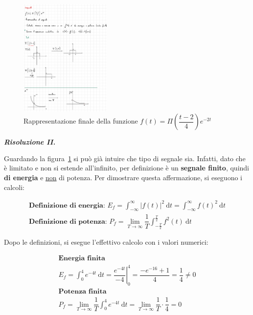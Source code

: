 \documentclass[a4paper]{article}
\begin{document}
	\begin{figure}[!htp]
		\centering
		\includegraphics[width=0.4\textwidth]{img/ex_exam/Sol_func_1.pdf}
		\caption{Rappresentazione finale della funzione $f(t) = \Pi \left(\dfrac{t-2}{4}\right) e^{-2t}$}\label{ex1_grafico}
	\end{figure}

	\newpage

	\noindent
	\textcolor{Green4}{\textbf{\emph{Risoluzione II.}}}

	Guardando la figura~\ref{ex1_grafico} si può già intuire che tipo di segnale sia. Infatti, dato che è limitato e non si estende all'infinito, per definizione è un \textbf{segnale finito}, quindi \textbf{di energia} e \underline{non} di potenza. Per dimostrare questa affermazione, si eseguono i calcoli:
	
	\begin{gather*}
		\textbf{Definizione di energia: } E_{f} = \int_{-\infty}^{\infty}{\left|f(t)\right|^2\:\mathrm{d}t} = \int_{-\infty}^{\infty}{f(t)^2\:\mathrm{d}t} \\
		\textbf{Definizione di potenza: } P_{f} = \lim_{T\rightarrow\infty}{\dfrac{1}{T} \int_{-\frac{T}{2}}^{\frac{T}{2}}{f^{2}(t)\:\mathrm{d}t}}
	\end{gather*}

	\noindent
	Dopo le definizioni, si esegue l'effettivo calcolo con i valori numerici:
	
	\begin{gather*}
		\textbf{Energia finita} \\
		E_{f} = \int_{0}^{4}{e^{-4t}\:\mathrm{d}t} = \left.\dfrac{e^{-4t}}{-4}\right\vert_{0}^{4} = \dfrac{-e^{-16}+1}{4} = \dfrac{1}{4} \ne 0 \\
		\textbf{Potenza finita} \\
		P_{f} = \lim_{T\rightarrow\infty}{\dfrac{1}{T} \int_{0}^{4}{e^{-4t}\:\mathrm{d}t}} = \lim_{T\rightarrow\infty}{\dfrac{1}{T}\cdot\dfrac{1}{4}} = 0
	\end{gather*}
\end{document}
